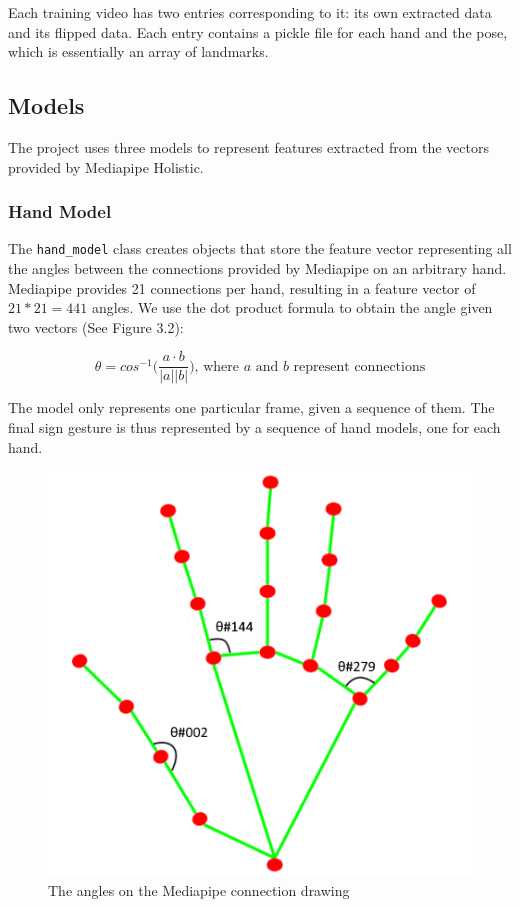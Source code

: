 \documentclass[final,rdr32.tex]{subfiles}
\begin{document}
Each training video has two entries corresponding to it: its own extracted data and its flipped data. Each entry contains a pickle file for each hand and the pose, which is essentially an array of landmarks.


\subsection{Models}
\label{sec:models}

The project uses three models to represent features extracted from the vectors provided by Mediapipe Holistic.

\subsubsection{Hand Model}
\label{sec:hand_model}

The \verb|hand_model| class creates objects that store the feature vector representing all the angles between the connections provided by Mediapipe on an arbitrary hand. Mediapipe provides 21 connections per hand, resulting in a feature vector of $21 * 21 = 441$ angles. We use the dot product formula to obtain the angle given two vectors (See Figure 3.2):

\begin{equation*}
    \theta = cos^{-1}\Big(\frac{a \cdot b}{|a| |b|}\Big) \text{, where $a$ and $b$ represent connections}
\end{equation*}

The model only represents one particular frame, given a sequence of them. The final sign gesture is thus represented by a sequence of hand models, one for each hand.

\begin{figure}[H]
    \begin{center}
        \includegraphics[scale=0.6]{images/hand_landmarks.png}
        \caption{The angles on the Mediapipe connection drawing}
    \end{center}
\end{figure}
\end{document}
